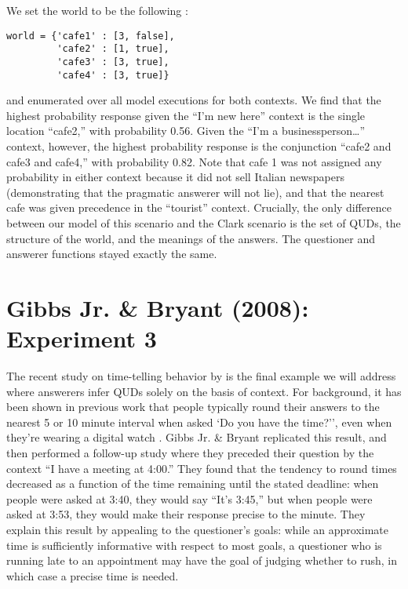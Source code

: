 \documentclass[10pt,letterpaper]{article}
\begin{document}
We set the world to be the following :

\begin{lstlisting}
world = {'cafe1' : [3, false],
         'cafe2' : [1, true],
         'cafe3' : [3, true],
         'cafe4' : [3, true]}
\end{lstlisting}
and enumerated over all model executions for both contexts. We find that the highest probability response given the ``I'm new here'' context is the single location ``cafe2,'' with probability 0.56. Given the ``I'm a businessperson\dots'' context, however, the highest probability response is the conjunction ``cafe2 and cafe3 and cafe4,'' with probability 0.82. Note that cafe 1 was not assigned any probability in either context because it did not sell Italian newspapers (demonstrating that the pragmatic answerer will not lie), and that the nearest cafe was given precedence in the ``tourist'' context. Crucially, the only difference between our model of this scenario and the Clark scenario is the set of QUDs, the structure of the world, and the meanings of the answers. The questioner and answerer functions stayed exactly the same.

\section{Gibbs Jr. \& Bryant (2008): Experiment 3}

The recent study on time-telling behavior by  is the final example we will address where answerers infer QUDs solely on the basis of context. For background, it has been shown in previous work that people typically round their answers to the nearest 5 or 10 minute interval when asked `Do you have the time?'', even when they're wearing a digital watch \cite{DerHenstCarlesSperber02_RelevanceTellingTime}. Gibbs Jr. \& Bryant replicated this result, and then performed a follow-up study where they preceded their question by the context ``I have a meeting at 4:00.'' They found that the tendency to round times decreased as a function of the time remaining until the stated deadline: when people were asked at 3:40, they would say ``It's 3:45,'' but when people were asked at 3:53, they would make their response precise to the minute. They explain this result by appealing to the questioner's goals: while an approximate time is sufficiently informative with respect to most goals, a questioner who is running late to an appointment may have the goal of judging whether to rush, in which case a precise time is needed.
\end{document}
